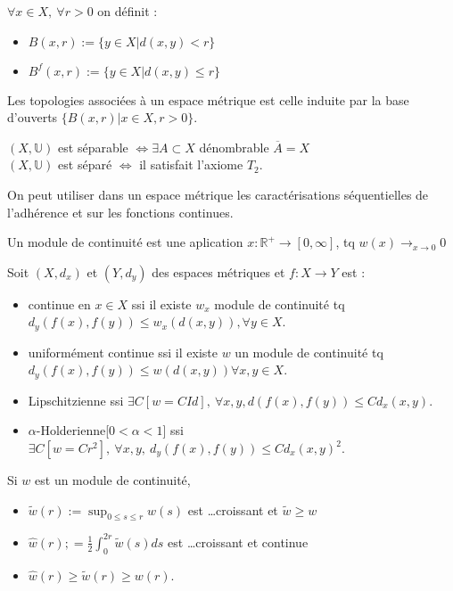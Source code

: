 \begin{definition}
    $\forall x\in X,\ \forall r>0$ on définit :
    \begin{itemize}
        \item $B(x,r):=\{y\in X|d(x,y)<r\} $
        \item $B^f(x,r):=\{y\in X|d(x,y)\le r\} $
    \end{itemize}
\end{definition}

Les topologies associées à un espace métrique est celle induite par la base d'ouverts $\{B(x,r)|x\in X,r>0\} $.

\begin{definition}
    $(X,\mathbb{U})$ est séparable $\Leftrightarrow \exists A\subset X $ dénombrable $\overline{A}=X$\\
$(X,\mathbb{U})$ est séparé $\Leftrightarrow $ il satisfait l'axiome $T_2$.
\end{definition}

On peut utiliser dans un espace métrique les caractérisations séquentielles de l'adhérence et sur les fonctions continues.

\begin{definition}
    Un module de continuité est une aplication $x:\mathbb{R} ^+\to [0,\infty ]$, tq $w(x)\to_{x\to 0} 0$
\end{definition}

Soit $(X,d_x)$ et $(Y,d_y)$ des espaces métriques et $f:X\to Y$ est :
\begin{itemize}
    \item continue en $x\in X$ ssi il existe $w_x$ module de continuité tq $d_y(f(x),f(y))\le w_x(d(x,y)), \forall y\in X$.
    \item uniformément continue ssi il existe $w$ un module de continuité tq $d_y(f(x),f(y))\le w(d(x,y)) \forall x,y\in X$.
    \item Lipschitzienne ssi $\exists C[w=CId],\ \forall x,y, d(f(x),f(y))\le Cd_x(x,y)$.
    \item $ \alpha$-Holderienne[$ 0<\alpha<1$]  ssi $\exists C[w=Cr^2],\ \forall x,y,\ d_y(f(x),f(y))\le Cd_x(x,y)^2$.
\end{itemize}

\begin{remarque}
    Si $w$ est un module de continuité,
    \begin{itemize}
        \item $\tilde{w}(r):=\sup_{0\le s\le r} w(s)$ est \ldots croissant et $\tilde w\ge w$
        \item $\hat{w}(r);=\frac{1}{2} \int_0^{2r}\tilde{w}(s)ds$ est \ldots croissant et continue
        \item $\hat{w}(r)\ge \tilde{w}(r)\ge w(r)$.
    \end{itemize}
\end{remarque}

